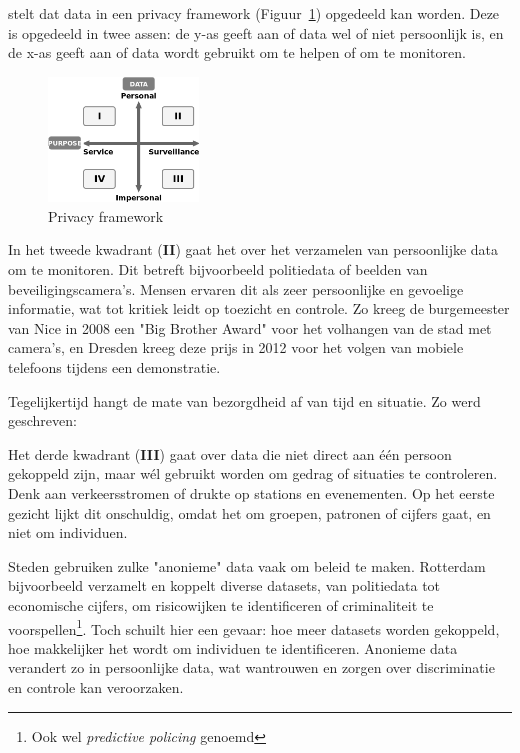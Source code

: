 \documentclass[nonacm, sigconf]{acmart}
\begin{document}
    \parencite{van2016privacy} stelt dat data in een privacy framework (Figuur~\ref{fig:privacy_framework}) opgedeeld kan worden.
    Deze is opgedeeld in twee assen: de y-as geeft aan of data wel of niet persoonlijk is, en de x-as geeft aan of data wordt gebruikt om te helpen of om te monitoren.

    \begin{figure}[h]
        \centering
        \includegraphics[width=40mm]{images/SmartCityPrivacy}
        \caption{Privacy framework {}}
        \label{fig:privacy_framework}
    \end{figure}

    In het tweede kwadrant (\textbf{II}) gaat het over het verzamelen van persoonlijke data om te monitoren.
    Dit betreft bijvoorbeeld politiedata of beelden van beveiligingscamera's.
    Mensen ervaren dit als zeer persoonlijke en gevoelige informatie, wat tot kritiek leidt op toezicht en controle.
    Zo kreeg de burgemeester van Nice in 2008 een "Big Brother Award" voor het volhangen van de stad met camera's, en Dresden kreeg deze prijs in 2012 voor het volgen van mobiele telefoons tijdens een demonstratie.

    Tegelijkertijd hangt de mate van bezorgdheid af van tijd en situatie.
    Zo werd geschreven:

    Het derde kwadrant (\textbf{III}) gaat over data die niet direct aan één persoon gekoppeld zijn, maar wél gebruikt worden om gedrag of situaties te controleren.
    Denk aan verkeersstromen of drukte op stations en evenementen.
    Op het eerste gezicht lijkt dit onschuldig, omdat het om groepen, patronen of cijfers gaat, en niet om individuen.

    Steden gebruiken zulke "anonieme" data vaak om beleid te maken.
    Rotterdam bijvoorbeeld verzamelt en koppelt diverse datasets, van politiedata tot economische cijfers, om risicowijken te identificeren of criminaliteit te voorspellen\footnote{Ook wel \textit{predictive policing} genoemd}.
    Toch schuilt hier een gevaar: hoe meer datasets worden gekoppeld, hoe makkelijker het wordt om individuen te identificeren.
    Anonieme data verandert zo in persoonlijke data, wat wantrouwen en zorgen over discriminatie en controle kan veroorzaken.
\end{document}
